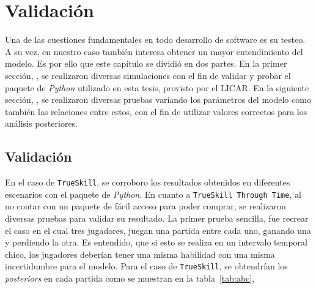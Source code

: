 \documentclass[11pt,twoside,spanish]{report} %
\begin{document}





\chapter{Validaci\'on}
Una de las cuestiones fundamentales en todo desarrollo de software es su testeo.
A su vez, en nuestro caso tambi\'en interesa obtener un mayor entendimiento del modelo.
Es por ello que este cap\'itulo se dividi\'o en dos partes.
En la primer secci\'on, , se realizaron diversas simulaciones con el fin de validar y probar el paquete de \textit{Python} utilizado en esta tesis, provisto por el LICAR.
En la siguiente secci\'on, , se realizaron diversas pruebas variando los  par\'ametros del modelo como tambi\'en las relaciones entre estos, con el fin de utilizar valores correctos para los an\'alisis posteriores.

\section{Validaci\'on}\label{sec:validacion}


En el caso de \texttt{TrueSkill}, se corroboro los resultados obtenidos en diferentes escenarios con el paquete de \textit{Python}.
En cuanto a \texttt{TrueSkill Through Time}, al no contar con un paquete de f\'acil acceso para poder comprar, se realizaron diversas pruebas para validar su resultado.
La primer prueba sencilla, fue recrear el caso en el cual tres jugadores, juegan una partida entre cada uno, ganando una y perdiendo la otra.
Es entendido, que si esto se realiza en un intervalo temporal chico, los jugadores deber\'ian tener una misma habilidad con una misma incertidumbre para el modelo.
Para el caso de \texttt{TrueSkill}, se obtendr\'ian los \textit{posteriors} en cada partida como se muestran en la tabla~\ref{tab:abc},
\end{document}
